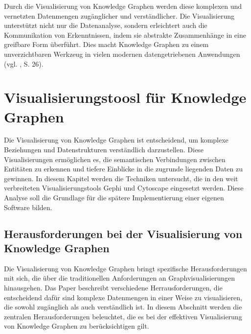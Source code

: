 Durch die Visualisierung von Knowledge Graphen werden diese komplexen und vernetzten Datenmengen zugänglicher und verständlicher. Die Visualisierung unterstützt nicht nur die Datenanalyse, sondern erleichtert auch die Kommunikation von Erkenntnissen, indem sie abstrakte Zusammenhänge in eine greifbare Form überführt. Dies macht Knowledge Graphen zu einem unverzichtbaren Werkzeug in vielen modernen datengetriebenen Anwendungen (vgl. \cite{knowledgeGraphIntroduction:Chaudhri}, S. 26).

\section{Visualisierungstoosl für Knowledge Graphen}

Die Visualisierung von Knowledge Graphen ist entscheidend, um komplexe Beziehungen und Datenstrukturen verständlich darzustellen. Diese Visualisierungen ermöglichen es, die semantischen Verbindungen zwischen Entitäten zu erkennen und tiefere Einblicke in die zugrunde liegenden Daten zu gewinnen. In diesem Kapitel werden die Techniken untersucht, die in den weit verbreiteten Visualisierungstools Gephi und Cytoscape eingesetzt werden. Diese Analyse soll die Grundlage für die spätere Implementierung einer eigenen Software bilden.

\subsection{Herausforderungen bei der Visualisierung von Knowledge Graphen}

Die Visualisierung von Knowledge Graphen bringt spezifische Herausforderungen mit sich, die über die traditionellen Anforderungen an Graphvisualisierungen hinausgehen. Das Paper  beschreibt verschiedene Herrausforderungen, die entscheidend dafür sind komplexe Datenmengen in einer Weise zu visualisieren, die sowohl zugänglich als auch verständlich ist. In diesem Abschnitt werden die zentralen Herausforderungen beleuchtet, die es bei der effektiven Visualisierung von Knowledge Graphen zu berücksichtigen gilt.


